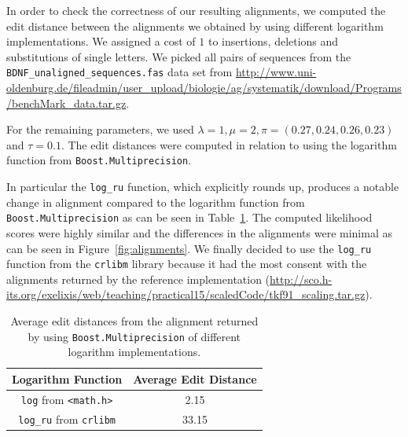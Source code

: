 \documentclass{article}
\begin{document}
In order to check the correctness of our resulting alignments, we computed the edit distance between the alignments we obtained by using different logarithm implementations. We assigned a cost of $1$ to insertions, deletions and substitutions of single letters. We picked all pairs of sequences from the \\ \texttt{BDNF\_unaligned\_sequences.fas} data set from \url{http://www.uni-oldenburg.de/fileadmin/user_upload/biologie/ag/systematik/download/Programs/benchMark_data.tar.gz}.

For the remaining parameters, we used $\lambda=1, \mu=2, \pi = (0.27, 0.24, 0.26,0.23)$ and $\tau = 0.1$. The edit distances were computed in relation to using the logarithm function from \texttt{Boost.Multiprecision}. 

In particular the \texttt{log\_ru} function, which explicitly rounds up, produces a notable change in alignment compared to the logarithm function from \\ \texttt{Boost.Multiprecision} as can be seen in Table~\ref{fig:dist}. The computed likelihood scores were highly similar and the differences in the alignments were minimal as can be seen in Figure~\ref{fig:alignments}. We finally decided to use the \texttt{log\_ru} function from the \texttt{crlibm} library because it had the most consent with the alignments returned by the reference implementation (\url{http://sco.h-its.org/exelixis/web/teaching/practical15/scaledCode/tkf91_scaling.tar.gz}).

\begin{table}[h!]

\centering

\begin{tabular}{|c|c|}
\hline 
Logarithm Function & Average Edit Distance \\ 
\hline 
\texttt{log} from \texttt{<math.h>} & 2.15 \\ 
\hline 
\texttt{log\_ru} from \texttt{crlibm} & 33.15 \\ 
\hline 
\end{tabular} 
\caption{Average edit distances from the alignment returned by using  \texttt{Boost.Multiprecision} of different logarithm implementations.}
\label{fig:dist}
\end{table}
\end{document}
